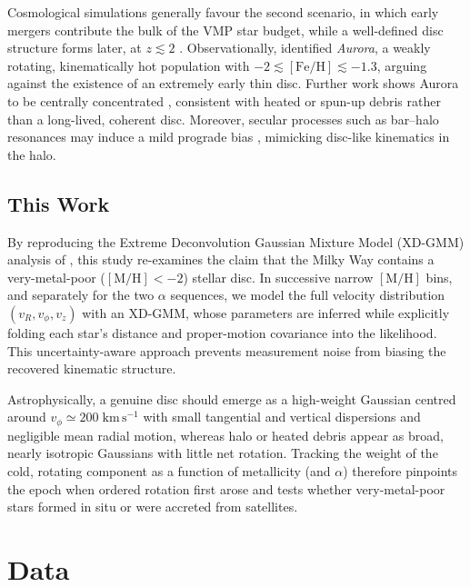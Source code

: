 \documentclass[a4paper,12pt]{article}
\begin{document}
Cosmological simulations generally favour the second scenario, in which early mergers contribute the bulk 
of the VMP star budget, while a well-defined disc structure forms later, at $z \lesssim 2$ \citep{Gurvich2023}. 
Observationally, \citet{Belokurov2022} identified \textit{Aurora}, a weakly rotating, kinematically hot population 
with $-2 \lesssim [\mathrm{Fe/H}] \lesssim -1.3$, arguing against the existence of an extremely early thin disc. 
Further work shows Aurora to be centrally concentrated \citep{Rix2022,Arentsen2020,Arentsen2020a}, 
consistent with heated or spun-up debris rather than a long-lived, coherent disc. 
Moreover, secular processes such as bar–halo resonances may induce a mild prograde bias 
\citep{Dillamore2023}, mimicking disc-like kinematics in the halo.
  

\subsection{This Work}

By reproducing the Extreme Deconvolution Gaussian Mixture Model (XD-GMM) analysis of \citet{zhang2024existencemetalpoordiscmilky},  
this study re-examines the claim that the Milky Way contains a very-metal-poor  
($[\mathrm{M/H}]<-2$) stellar disc.  
In successive narrow $[\mathrm{M/H}]$ bins, and separately for the two  
$\alpha$ sequences, we model the full velocity distribution  
$(v_R,v_\phi,v_z)$ with an XD-GMM, whose  
parameters are inferred while explicitly folding each star's distance and proper-motion  
covariance into the likelihood.  This uncertainty-aware approach prevents measurement noise  
from biasing the recovered kinematic structure.

Astrophysically, a genuine disc should emerge as a high-weight Gaussian centred around  
$v_\phi\!\simeq\!200\;\mathrm{km\,s^{-1}}$ with small tangential and vertical dispersions  
and negligible mean radial motion, whereas halo or heated debris appear as broad, nearly  
isotropic Gaussians with little net rotation.  Tracking the weight of the cold,  
rotating component as a function of metallicity (and $\alpha$) therefore pinpoints the  
epoch when ordered rotation first arose and tests whether very-metal-poor stars formed  
in situ or were accreted from satellites.



\section{Data}
\label{sec:data}
\end{document}
